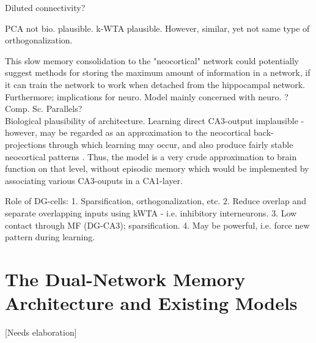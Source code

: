 Diluted connectivity?

PCA not bio. plausible. k-WTA plausible. However, similar, yet not same type of orthogonalization.

This slow memory consolidation to the "neocortical" network could potentially suggest methods for storing the maximum amount of information in a network, if it can train the network to work when detached from the hippocampal network.
\\
Furthermore; implications for neuro. Model mainly concerned with neuro. ? Comp. Sc. Parallels?
\\

Biological plausibility of \citep{McClelland1995} architecture. Learning direct CA3-output implausible - however, may be regarded as an approximation to the neocortical back-projections through which learning may occur, and also produce fairly stable neocortical patterns \citep{Rolls1998chpt6}. Thus, the model is a very crude approximation to brain function on that level, without episodic memory which would be implemented by associating various CA3-ouputs in a CA1-layer.

Role of DG-cells: 
1. Sparsification, orthogonalization, etc.
2. Reduce overlap and separate overlapping inputs using kWTA - i.e. inhibitory interneurons.
3. Low contact through MF (DG-CA3); sparsification.
4. May be powerful, i.e. force new pattern during learning.
\citep{Rolls1998chpt6}

\section{The Dual-Network Memory Architecture and Existing Models}\label{chpt:existing-models}[Needs elaboration]

